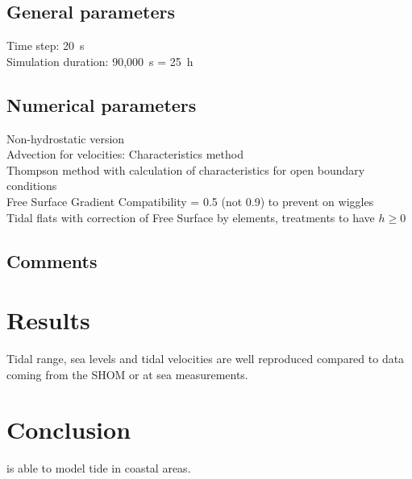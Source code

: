 \subsection{General parameters}
%
Time step: 20~s\\
Simulation duration: 90,000~s = 25~h
%
%
%
\subsection{Numerical parameters}
%
Non-hydrostatic version\\
Advection for velocities: Characteristics method\\
Thompson method with calculation of characteristics for open boundary
conditions\\
Free Surface Gradient Compatibility = 0.5 (not 0.9) to prevent on
wiggles\\
Tidal flats with correction of Free Surface by elements, treatments
to have $h \ge 0$
%
\subsection{Comments}
%
%
%
\section{Results}
%
Tidal range, sea levels and tidal velocities are well reproduced compared to
data coming from the SHOM or at sea measurements.
%
\section{Conclusion}
%
 is able to model tide in coastal areas.
%
%
